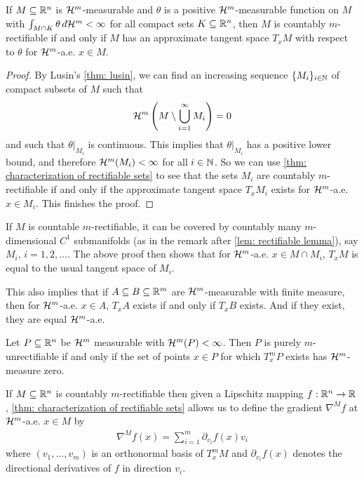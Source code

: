 \begin{theorem}\label{thm: characterization of rectifiable sets 2}
If $M \subseteq \mathbb{R}^n$ is $\mathcal{H}^m$-measurable and $\theta$ is a positive $\mathcal{H}^m$-measurable function on $M$ with $\int_{M \cap K} \theta\, d\mathcal{H}^m < \infty$ for all compact sets $K \subseteq \mathbb{R}^n$, then $M$ is countably $m$-rectifiable if and only if $M$ has an approximate tangent space $T_xM$ with respect to $\theta$ for $\mathcal{H}^m$-a.e. $x \in M$.
\end{theorem}
\begin{proof}
By Lusin's \cref{thm: lusin}, we can find an increasing sequence $\{M_i\}_{i \in \mathbb{N}}$ of compact subsets of $M$ such that
\[
    \mathcal{H}^m\left(M \setminus \bigcup_{i=1}^{\infty} M_i\right) = 0
\]
and such that $\theta|_{M_i}$ is continuous. This implies that $\theta|_{M_i}$ has a positive lower bound, and therefore $\mathcal{H}^m(M_i) < \infty$ for all $i \in \mathbb{N}$. So we can use \cref{thm: characterization of rectifiable sets} to see that the sets $M_i$ are countably $m$-rectifiable if and only if the approximate tangent space $T_xM_i$ exists for $\mathcal{H}^m$-a.e. $x \in M_i$. This finishes the proof.
\end{proof}

If $M$ is countable $m$-rectifiable, it can be covered by countably many $m$-dimensional $C^1$ submanifolds (as in the remark after \cref{lem: rectifiable lemma}), say $M_i$, $i=1,2, \dots$. The above proof then shows that for $\mathcal{H}^m$-a.e. $x \in M \cap M_i$, $T_xM$ is equal to the usual tangent space of $M_i$.

This also implies that if $A \subseteq B \subseteq \mathbb{R}^m$ are $\mathcal{H}^m$-measurable with finite measure, then for $\mathcal{H}^m$-a.e. $x \in A$, $T_xA$ exists if and only if $T_xB$ exists. And if they exist, they are equal $\mathcal{H}^m$-a.e.

\begin{corollary}
Let $P \subseteq \mathbb{R}^n$ be $\mathcal{H}^m$ measurable with $\mathcal{H}^m(P)<\infty$. Then $P$ is purely $m$-unrectifiable if and only if the set of points $x \in P$ for which $T_x^mP$ exists has $\mathcal{H}^m$-measure zero.
\end{corollary}

If $M\subseteq \mathbb{R}^n$ is countably $m$-rectifiable then given a Lipschitz mapping $f:\mathbb{R}^n \to \mathbb{R}$, \cref{thm: characterization of rectifiable sets} allows us to define the gradient $\nabla^Mf$ at $\mathcal{H}^m$-a.e. $x \in M$ by
\begin{align*}
    \nabla^Mf(x)=\sum_{i=1}^m \partial_{v_i}f(x)v_i
\end{align*}
where $(v_1, \dots,v_m)$ is an orthonormal basis of $T_x^mM$ and $\partial_{v_i}f(x)$ denotes the directional derivatives of $f$ in direction $v_i$.

